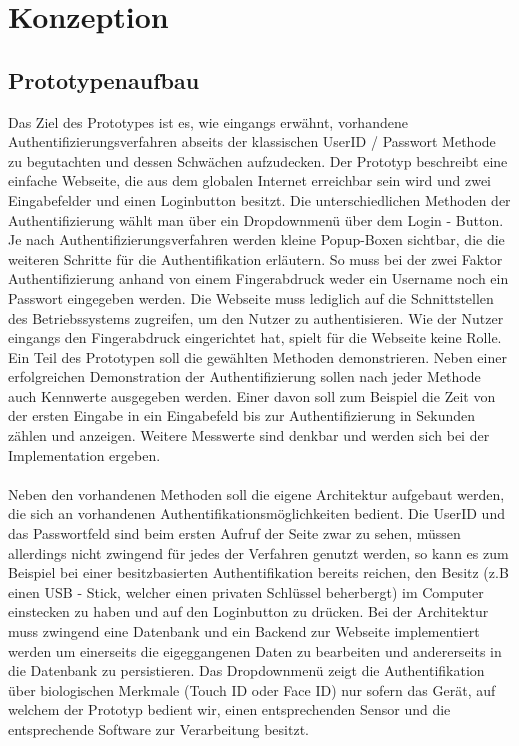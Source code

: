 \chapter{Konzeption}
\section{Prototypenaufbau}
Das Ziel des Prototypes ist es, wie eingangs erwähnt, vorhandene Authentifizierungsverfahren abseits der klassischen UserID / Passwort Methode zu begutachten und dessen Schwächen aufzudecken. Der Prototyp beschreibt eine einfache Webseite, die aus dem globalen Internet erreichbar sein wird und zwei Eingabefelder und einen Loginbutton besitzt. Die unterschiedlichen Methoden der Authentifizierung wählt man über ein Dropdownmenü über dem Login - Button. Je nach Authentifizierungsverfahren werden kleine Popup-Boxen sichtbar, die die weiteren Schritte für die Authentifikation erläutern. So muss bei der zwei Faktor Authentifizierung anhand von einem Fingerabdruck weder ein Username noch ein Passwort eingegeben werden. Die Webseite muss lediglich auf die Schnittstellen des Betriebssystems zugreifen, um den Nutzer zu authentisieren. Wie der Nutzer eingangs den Fingerabdruck eingerichtet hat, spielt für die Webseite keine Rolle.
Ein Teil des Prototypen soll die gewählten Methoden demonstrieren. Neben einer erfolgreichen Demonstration der Authentifizierung sollen nach jeder Methode auch Kennwerte ausgegeben werden. Einer davon soll zum Beispiel die Zeit von der ersten Eingabe in ein Eingabefeld bis zur Authentifizierung in Sekunden zählen und anzeigen. Weitere Messwerte sind denkbar und werden sich bei der Implementation ergeben. \\
\\
Neben den vorhandenen Methoden soll die eigene Architektur aufgebaut werden, die sich an vorhandenen Authentifikationsmöglichkeiten bedient. Die UserID und das Passwortfeld sind beim ersten Aufruf der Seite zwar zu sehen, müssen allerdings nicht zwingend für jedes der Verfahren genutzt werden, so kann es zum Beispiel bei einer besitzbasierten Authentifikation bereits reichen, den Besitz (z.B einen USB - Stick, welcher einen privaten Schlüssel beherbergt) im Computer einstecken zu haben und auf den Loginbutton zu drücken. Bei der Architektur muss zwingend eine Datenbank und ein Backend zur Webseite implementiert werden um einerseits die eigeggangenen Daten zu bearbeiten und andererseits in die Datenbank zu persistieren. Das Dropdownmenü zeigt die Authentifikation über biologischen Merkmale (Touch ID oder Face ID) nur sofern das Gerät, auf welchem der Prototyp bedient wir, einen entsprechenden Sensor und die entsprechende Software zur Verarbeitung besitzt.

